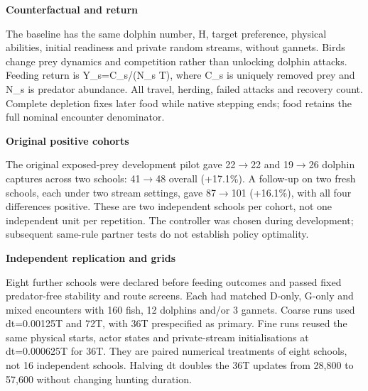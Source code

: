 \documentclass[10pt,a4paper]{article}
\begin{document}
\begin{minipage}[t]{238.10999999999999pt}\vspace{0pt}
\textbf{Counterfactual and return}\par The baseline has the same dolphin number, H, target preference, physical abilities, initial readiness and private random streams, without gannets. Birds change prey dynamics and competition rather than unlocking dolphin attacks. Feeding return is Y\_s=C\_s/(N\_s T), where C\_s is uniquely removed prey and N\_s is predator abundance. All travel, herding, failed attacks and recovery count. Complete depletion fixes later food while native stepping ends; food retains the full nominal encounter denominator.\par\smallskip
\textbf{Original positive cohorts}\par The original exposed-prey development pilot gave 22\ensuremath{\rightarrow}22 and 19\ensuremath{\rightarrow}26 dolphin captures across two schools: 41\ensuremath{\rightarrow}48 overall (+17.1\%). A follow-up on two fresh schools, each under two stream settings, gave 87\ensuremath{\rightarrow}101 (+16.1\%), with all four differences positive. These are two independent schools per cohort, not one independent unit per repetition. The controller was chosen during development; subsequent same-rule partner tests do not establish policy optimality.\par\smallskip
\textbf{Independent replication and grids}\par Eight further schools were declared before feeding outcomes and passed fixed predator-free stability and route screens. Each had matched D-only, G-only and mixed encounters with 160 fish, 12 dolphins and/or 3 gannets. Coarse runs used dt=0.00125T and 72T, with 36T prespecified as primary. Fine runs reused the same physical starts, actor states and private-stream initialisations at dt=0.000625T for 36T. They are paired numerical treatments of eight schools, not 16 independent schools. Halving dt doubles the 36T updates from 28,800 to 57,600 without changing hunting duration.\par\smallskip
\end{minipage}
\hfill
\end{document}
